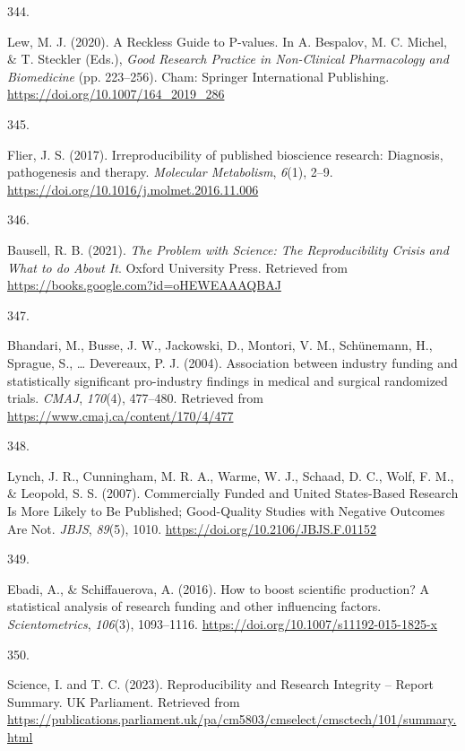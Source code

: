 \documentclass[
  11pt,
  letterpaper,
]{scrreprt}
\newlength{\cslhangindent}
\newlength{\csllabelwidth}
\newenvironment{CSLReferences}[2] %
 {\begin{list}{}{%
  \setlength{\itemindent}{0pt}
  \setlength{\leftmargin}{0pt}
  \setlength{\parsep}{0pt}
  \ifodd #1
   \setlength{\leftmargin}{\cslhangindent}
   \setlength{\itemindent}{-1\cslhangindent}
  \fi
  \setlength{\itemsep}{#2\baselineskip}}}
 {\end{list}}
\newcommand{\CSLLeftMargin}[1]{\parbox[t]{\csllabelwidth}{\strut#1\strut}}
\newcommand{\CSLRightInline}[1]{\parbox[t]{\linewidth - \csllabelwidth}{\strut#1\strut}}
\begin{document}
\begin{CSLReferences}{0}{0}
\CSLLeftMargin{344. }%
\CSLRightInline{Lew, M. J. (2020). A {Reckless Guide} to {P-values}. In
A. Bespalov, M. C. Michel, \& T. Steckler (Eds.), \emph{Good {Research
Practice} in {Non-Clinical Pharmacology} and {Biomedicine}} (pp.
223--256). Cham: Springer International Publishing.
\url{https://doi.org/10.1007/164_2019_286}}

\CSLLeftMargin{345. }%
\CSLRightInline{Flier, J. S. (2017). Irreproducibility of published
bioscience research: {Diagnosis}, pathogenesis and therapy.
\emph{Molecular Metabolism}, \emph{6}(1), 2--9.
\url{https://doi.org/10.1016/j.molmet.2016.11.006}}

\CSLLeftMargin{346. }%
\CSLRightInline{Bausell, R. B. (2021). \emph{The {Problem} with
{Science}: {The Reproducibility Crisis} and {What} to do {About It}}.
Oxford University Press. Retrieved from
\url{https://books.google.com?id=oHEWEAAAQBAJ}}

\CSLLeftMargin{347. }%
\CSLRightInline{Bhandari, M., Busse, J. W., Jackowski, D., Montori, V.
M., Schünemann, H., Sprague, S., \ldots{} Devereaux, P. J. (2004).
Association between industry funding and statistically significant
pro-industry findings in medical and surgical randomized trials.
\emph{CMAJ}, \emph{170}(4), 477--480. Retrieved from
\url{https://www.cmaj.ca/content/170/4/477}}

\CSLLeftMargin{348. }%
\CSLRightInline{Lynch, J. R., Cunningham, M. R. A., Warme, W. J.,
Schaad, D. C., Wolf, F. M., \& Leopold, S. S. (2007). Commercially
{Funded} and {United States-Based Research Is More Likely} to {Be
Published}; {Good-Quality Studies} with {Negative Outcomes Are Not}.
\emph{JBJS}, \emph{89}(5), 1010.
\url{https://doi.org/10.2106/JBJS.F.01152}}

\CSLLeftMargin{349. }%
\CSLRightInline{Ebadi, A., \& Schiffauerova, A. (2016). How to boost
scientific production? {A} statistical analysis of research funding and
other influencing factors. \emph{Scientometrics}, \emph{106}(3),
1093--1116. \url{https://doi.org/10.1007/s11192-015-1825-x}}

\CSLLeftMargin{350. }%
\CSLRightInline{Science, I. and T. C. (2023). Reproducibility and
{Research Integrity} -- {Report Summary}. UK Parliament. Retrieved from
\url{https://publications.parliament.uk/pa/cm5803/cmselect/cmsctech/101/summary.html}}


\end{CSLReferences}
\end{document}
